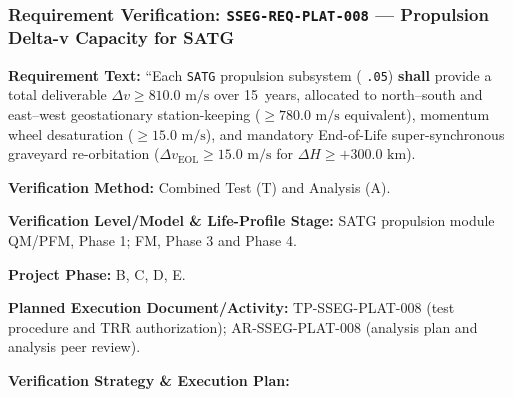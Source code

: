 \subsubsection{Requirement Verification: \texttt{SSEG-REQ-PLAT-008} --- Propulsion Delta-v Capacity for SATG}
\label{ver:SSEG-REQ-PLAT-008}
\textbf{Requirement Text:} ``Each \texttt{SATG} propulsion subsystem ( \texttt{.05}) \textbf{shall} provide a total deliverable $\Delta v \ge 810.0\text{ m/s}$ over 15~years, allocated to north--south and east--west geostationary station-keeping ($\ge 780.0\text{ m/s}$ equivalent), momentum wheel desaturation ($\ge 15.0\text{ m/s}$), and mandatory End-of-Life super-synchronous graveyard re-orbitation ($\Delta v_{\text{EOL}} \ge 15.0\text{ m/s}$ for $\Delta H \ge +300.0\text{ km}$).
\par\textbf{Verification Method:} Combined Test (T) and Analysis (A).
\par\textbf{Verification Level/Model \& Life-Profile Stage:} SATG propulsion module QM/PFM, Phase 1; FM, Phase 3 and Phase 4.
\par\textbf{Project Phase:} B, C, D, E.
\par\textbf{Planned Execution Document/Activity:} TP-SSEG-PLAT-008 (test procedure and TRR authorization); AR-SSEG-PLAT-008 (analysis plan and analysis peer review).
\par\textbf{Verification Strategy \& Execution Plan:}
